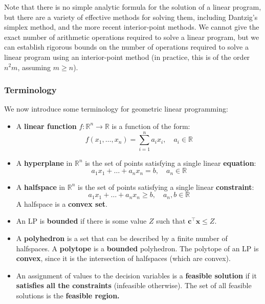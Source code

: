 \documentclass{article}
\begin{document}
\noindent Note that there is no simple analytic formula for the solution of a linear program, but there are a variety of effective methods for solving them, including Dantzig's simplex method, and the more recent interior-point methods. We cannot give the exact number of arithmetic operations required to solve a linear program, but we can establish rigorous bounds on the number of operations required to solve a linear program using an interior-point method (in practice, this is of the order $n^{2}m$, assuming $m \geq n$). 

\subsubsection{Terminology}

\begin{definition}
    We now introduce some terminology for geometric linear programming:
    \begin{itemize}
        \item A \textbf{linear function} $f : \mathbb{R}^{n} \to \mathbb{R}$ is a function of the form: \begin{equation*}
            f(x_{1}, \dots , x_n) = \sum_{i=1}^{n} a_i x_i, \quad a_i \in \mathbb{R}
        \end{equation*}
        \item A \textbf{hyperplane} in $\mathbb{R}^{n}$ is the set of points satisfying a single linear \textbf{equation}:
        \begin{equation*}
            a_{1}x_{1} + \dots + a_n x_n = b, \quad a_n \in \mathbb{R}
        \end{equation*}
        \item A \textbf{halfspace} in $\mathbb{R}^{n}$ is the set of points satisfying a single linear \textbf{constraint}: 
        \begin{equation*}
            a_{1}x_{1} + \dots + a_n x_n \geq b, \quad a_n, b \in \mathbb{R}
        \end{equation*}
        \noindent A halfspace is a \textbf{convex set}.
        \item An LP is \textbf{bounded} if there is some value $Z$ such that $\mathbf{c}^{\top}\mathbf{x} \leq Z$. 
        \item A \textbf{polyhedron} is a set that can be described by a finite number of halfspaces. A \textbf{polytope} is a \textbf{bounded} polyhedron. The polytope of an LP is \textbf{convex}, since it is the intersection of halfspaces (which are convex).
        \item An assignment of values to the decision variables is a \textbf{feasible solution} if it \textbf{satisfies all the constraints} (infeasible otherwise). The set of all feasible solutions is the \textbf{feasible region.}

\end{itemize}
\end{definition}
\end{document}
